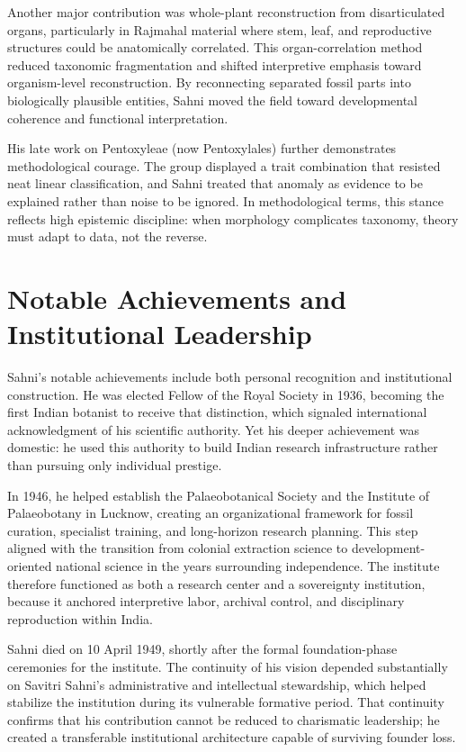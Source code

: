 \documentclass[10pt]{article}
\begin{document}
Another major contribution was whole-plant reconstruction from disarticulated organs, particularly in Rajmahal material where stem, leaf, and reproductive structures could be anatomically correlated. This organ-correlation method reduced taxonomic fragmentation and shifted interpretive emphasis toward organism-level reconstruction. By reconnecting separated fossil parts into biologically plausible entities, Sahni moved the field toward developmental coherence and functional interpretation.\cite{palaeobot_bio,review_indian_paleobotany}

His late work on Pentoxyleae (now Pentoxylales) further demonstrates methodological courage. The group displayed a trait combination that resisted neat linear classification, and Sahni treated that anomaly as evidence to be explained rather than noise to be ignored. In methodological terms, this stance reflects high epistemic discipline: when morphology complicates taxonomy, theory must adapt to data, not the reverse.\cite{pentoxyleae_intro,pentoxylales_affinities}

\section*{Notable Achievements and Institutional Leadership}
Sahni's notable achievements include both personal recognition and institutional construction. He was elected Fellow of the Royal Society in 1936, becoming the first Indian botanist to receive that distinction, which signaled international acknowledgment of his scientific authority. Yet his deeper achievement was domestic: he used this authority to build Indian research infrastructure rather than pursuing only individual prestige.\cite{ias_memorial,wiki_birbal,jstor_obit}

In 1946, he helped establish the Palaeobotanical Society and the Institute of Palaeobotany in Lucknow, creating an organizational framework for fossil curation, specialist training, and long-horizon research planning. This step aligned with the transition from colonial extraction science to development-oriented national science in the years surrounding independence. The institute therefore functioned as both a research center and a sovereignty institution, because it anchored interpretive labor, archival control, and disciplinary reproduction within India.\cite{bsip_history,bsip_wiki,nation_impact_science,csir_ecosystem}

Sahni died on 10 April 1949, shortly after the formal foundation-phase ceremonies for the institute. The continuity of his vision depended substantially on Savitri Sahni's administrative and intellectual stewardship, which helped stabilize the institution during its vulnerable formative period. That continuity confirms that his contribution cannot be reduced to charismatic leadership; he created a transferable institutional architecture capable of surviving founder loss.\cite{bsip_history,ias_memorial,from_lahore_lucknow}
\end{document}
